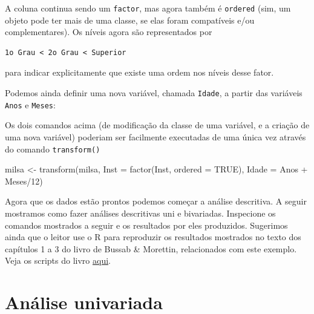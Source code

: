 \documentclass[
  10pt,
  a4paper]{book}
\newenvironment{Shaded}{\begin{snugshade}}{\end{snugshade}}
\newcommand{\AttributeTok}[1]{\textcolor[rgb]{0.77,0.63,0.00}{#1}}
\newcommand{\ConstantTok}[1]{\textcolor[rgb]{0.00,0.00,0.00}{#1}}
\newcommand{\DecValTok}[1]{\textcolor[rgb]{0.00,0.00,0.81}{#1}}
\newcommand{\FunctionTok}[1]{\textcolor[rgb]{0.00,0.00,0.00}{#1}}
\newcommand{\NormalTok}[1]{#1}
\newcommand{\OtherTok}[1]{\textcolor[rgb]{0.56,0.35,0.01}{#1}}
\newcommand{\SpecialCharTok}[1]{\textcolor[rgb]{0.00,0.00,0.00}{#1}}
\begin{document}
A coluna continua sendo um \texttt{factor}, mas agora também é \texttt{ordered} (sim,
um objeto pode ter mais de uma classe, se elas foram compatíveis e/ou
complementares). Os níveis agora são representados por

\begin{verbatim}
1o Grau < 2o Grau < Superior
\end{verbatim}

para indicar explicitamente que existe uma ordem nos níveis desse fator.

Podemos ainda definir uma nova variável, chamada \texttt{Idade}, a partir das
variáveis \texttt{Anos} e \texttt{Meses}:

\begin{Shaded}
\end{Shaded}

Os dois comandos acima (de modificação da classe de uma variável, e a
criação de uma nova variável) poderiam ser facilmente executadas de uma
única vez através do comando \texttt{transform()}

\begin{Shaded}
\begin{Highlighting}[]
\NormalTok{milsa }\OtherTok{\textless{}{-}} \FunctionTok{transform}\NormalTok{(milsa,}
                   \AttributeTok{Inst =} \FunctionTok{factor}\NormalTok{(Inst, }\AttributeTok{ordered =} \ConstantTok{TRUE}\NormalTok{),}
                   \AttributeTok{Idade =}\NormalTok{ Anos }\SpecialCharTok{+}\NormalTok{ Meses}\SpecialCharTok{/}\DecValTok{12}\NormalTok{)}
\end{Highlighting}
\end{Shaded}

Agora que os dados estão prontos podemos começar a análise descritiva.
A seguir mostramos como fazer análises descritivas uni e bivariadas.
Inspecione os comandos mostrados a seguir e os resultados por eles
produzidos. Sugerimos ainda que o leitor use o R para reproduzir os
resultados mostrados no texto dos capítulos 1 a 3 do livro de Bussab \&
Morettin, relacionados com este exemplo. Veja os scripts do livro
\href{https://rpubs.com/EstatBasica/Introd}{aqui}.

\hypertarget{anuxe1lise-univariada}{%
\section{Análise univariada}\label{anuxe1lise-univariada}}
\end{document}
